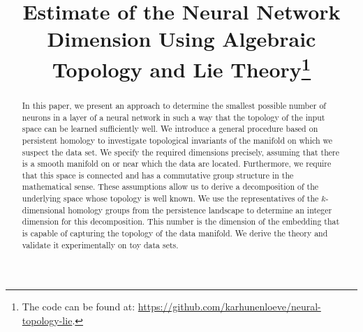 \documentclass[runningheads,orivec]{llncs}
\begin{document}
%
\title{Estimate of the Neural Network Dimension Using Algebraic Topology and Lie Theory\thanks{The code can be found at: \href{https://github.com/karhunenloeve/neural-topology-lie}{https://github.com/karhunenloeve/neural-topology-lie}.}}
%
%

%
%
%
\maketitle              %
%
\begin{abstract}
In this paper, we present an approach to determine the smallest possible number of neurons in a layer of a neural network in such a way that the topology of the input space can be learned sufficiently well. We introduce a general procedure based on persistent homology to investigate topological invariants of the manifold on which we suspect the data set. We specify the required dimensions precisely, assuming that there is a smooth manifold on or near which the data are located. Furthermore, we require that this space is connected and has a commutative group structure in the mathematical sense. These assumptions allow us to derive a decomposition of the underlying space whose topology is well known. We use the representatives of the $k$-dimensional homology groups from the persistence landscape to determine an integer dimension for this decomposition. This number is the dimension of the embedding that is capable of capturing the topology of the data manifold. We derive the theory and validate it experimentally on toy data sets. 

\end{abstract}
\end{document}
